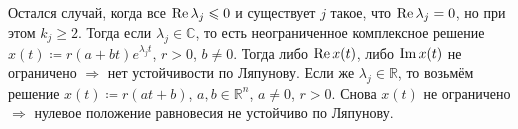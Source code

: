 \begin{enumerate}
Остался случай, когда все $\operatorname{Re} \lambda_j \leqslant 0$ и существует $j$ такое, что $\operatorname{Re} \lambda_j = 0$, но при этом $k_j \ge 2$. Тогда если $\lambda_j \in \mathbb C$, то есть неограниченное комплексное решение $x(t) \coloneq r(a+bt)e^{\lambda_jt}$, $r > 0$, $b \ne 0$. Тогда либо $\operatorname{Re} x(t)$, либо $\operatorname{Im} x(t)$ не ограничено $\Rightarrow$ нет устойчивости по Ляпунову.
Если же $\lambda_j \in \mathbb R$, то возьмём решение $x(t) \coloneq r(at + b)$, $a, b \in \mathbb R^n$, $a \ne 0$, $r > 0$. Снова $x(t)$ не ограничено $\Rightarrow$ нулевое положение равновесия не устойчиво по Ляпунову.
\end{enumerate}

\QED




